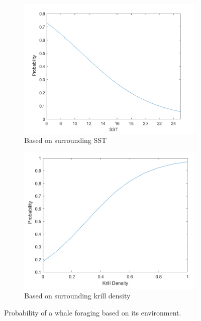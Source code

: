 \documentclass[11pt]{article}
\begin{document}
\begin{figure}[H]
	\centering
	\begin{subfigure}{3.2in}
		\includegraphics[width=\textwidth]{change_sst_pdf.png}
		\caption{Based on surrounding SST}
	\end{subfigure}
	\begin{subfigure}{3in}
		\includegraphics[width=\textwidth]{change_krill_pdf.png}
		\caption{Based on surrounding krill density}
	\end{subfigure}
    \caption{Probability of a whale foraging based on its environment.}
    \label{fig:probkrill}    
    \label{fig:probsst}
\end{figure}
\end{document}
